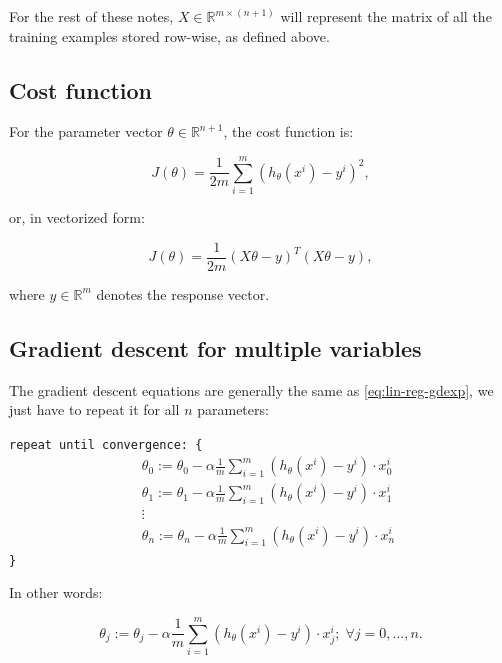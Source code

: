 \documentclass[a4paper,11pt]{report}
\newcommand{\ds}{\displaystyle}
\begin{document}
For the rest of these notes, $X\in\mathbb{R}^{m\times(n+1)}$ will represent the matrix of all the training examples stored row-wise, as defined above.

\subsection*{Cost function}

For the parameter vector $\theta\in \mathbb{R}^{n+1}$, the cost function is:

\begin{equation}\label{eq:mul-reg-cost}
J(\theta) = \ds\frac{1}{2m}\sum_{i=1}^{m}{(h_\theta(x^i)- y^i)^2},
\end{equation}

or, in vectorized form:

\begin{equation}\label{eq:mul-reg-cost-vec}
J(\theta) = \dfrac{1}{2m}(X\theta - {y})^T(X\theta - {y}),
\end{equation}

where $y\in \mathbb{R}^m$ denotes the response vector.


\subsection*{Gradient descent for multiple variables}

The gradient descent equations are generally the same as \eqref{eq:lin-reg-gdexp}, we just have to repeat it for all $n$ parameters:

\verb"repeat until convergence: {"
\begin{align*}
\; & \theta_0 := \theta_0 - \alpha \frac{1}{m} \sum\limits_{i=1}^{m} (h_\theta(x^{i}) - y^{i}) \cdot x_0^{i}\\
\; & \theta_1 := \theta_1 - \alpha \frac{1}{m} \sum\limits_{i=1}^{m} (h_\theta(x^{i}) - y^{i}) \cdot x_1^{i} \\
& \vdots \\
\; & \theta_n := \theta_n - \alpha \frac{1}{m} \sum\limits_{i=1}^{m} (h_\theta(x^{i}) - y^{i}) \cdot x_n^{i}
\end{align*}
\verb"}"

In other words:

\begin{equation}\label{eq:mul-reg-gdexp}
\theta_j := \theta_j - \alpha \frac{1}{m} \sum\limits_{i=1}^{m} (h_\theta(x^{i}) - y^{i}) \cdot x_j^{i}; \; \forall j = 0, \ldots, n.
\end{equation}
\end{document}
